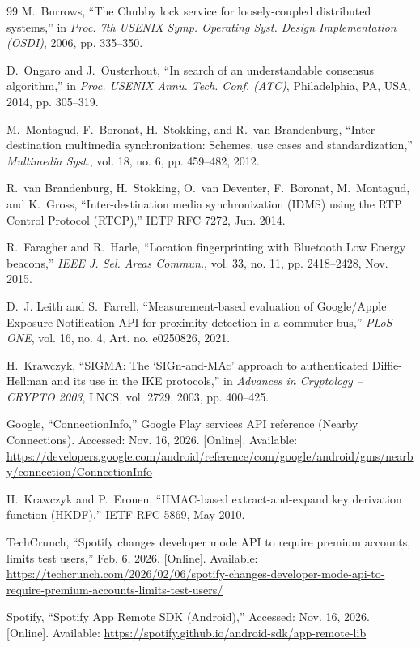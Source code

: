 \documentclass[conference]{IEEEtran}
\begin{document}
\begin{thebibliography}{99}
M.~Burrows, ``The Chubby lock service for loosely-coupled distributed systems,'' in \emph{Proc. 7th USENIX Symp. Operating Syst. Design Implementation (OSDI)}, 2006, pp. 335--350.

D.~Ongaro and J.~Ousterhout, ``In search of an understandable consensus algorithm,'' in \emph{Proc. USENIX Annu. Tech. Conf. (ATC)}, Philadelphia, PA, USA, 2014, pp. 305--319.

M.~Montagud, F.~Boronat, H.~Stokking, and R.~van Brandenburg, ``Inter-destination multimedia synchronization: Schemes, use cases and standardization,'' \emph{Multimedia Syst.}, vol. 18, no. 6, pp. 459--482, 2012.

R.~van Brandenburg, H.~Stokking, O.~van Deventer, F.~Boronat, M.~Montagud, and K.~Gross, ``Inter-destination media synchronization (IDMS) using the RTP Control Protocol (RTCP),'' IETF RFC 7272, Jun. 2014.

R.~Faragher and R.~Harle, ``Location fingerprinting with Bluetooth Low Energy beacons,'' \emph{IEEE J. Sel. Areas Commun.}, vol. 33, no. 11, pp. 2418--2428, Nov. 2015.

D.~J. Leith and S.~Farrell, ``Measurement-based evaluation of Google/Apple Exposure Notification API for proximity detection in a commuter bus,'' \emph{PLoS ONE}, vol. 16, no. 4, Art. no. e0250826, 2021.

H.~Krawczyk, ``SIGMA: The `SIGn-and-MAc' approach to authenticated Diffie-Hellman and its use in the IKE protocols,'' in \emph{Advances in Cryptology -- CRYPTO 2003}, LNCS, vol. 2729, 2003, pp. 400--425.

Google, ``ConnectionInfo,'' Google Play services API reference (Nearby Connections). Accessed: Nov. 16, 2026. [Online]. Available: \url{https://developers.google.com/android/reference/com/google/android/gms/nearby/connection/ConnectionInfo}

H.~Krawczyk and P.~Eronen, ``HMAC-based extract-and-expand key derivation function (HKDF),'' IETF RFC 5869, May 2010.

TechCrunch, ``Spotify changes developer mode API to require premium accounts, limits test users,'' Feb. 6, 2026. [Online]. Available: \url{https://techcrunch.com/2026/02/06/spotify-changes-developer-mode-api-to-require-premium-accounts-limits-test-users/}

Spotify, ``Spotify App Remote SDK (Android),'' Accessed: Nov. 16, 2026. [Online]. Available: \url{https://spotify.github.io/android-sdk/app-remote-lib}

\end{thebibliography}
\end{document}
